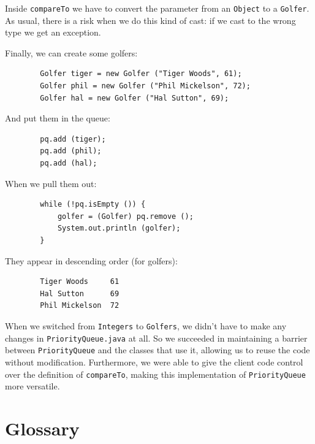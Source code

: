 \documentclass[12pt]{book}
\theoremstyle{exercise}
\begin{document}
Inside {\tt compareTo} we have to convert the parameter from
an {\tt Object} to a {\tt Golfer}.  As usual, there is a risk
when we do this kind of cast: if we cast to the wrong type we
get an exception.

Finally, we can create some golfers:

\begin{verbatim}
        Golfer tiger = new Golfer ("Tiger Woods", 61);
        Golfer phil = new Golfer ("Phil Mickelson", 72);
        Golfer hal = new Golfer ("Hal Sutton", 69);
\end{verbatim}
%
And put them in the queue:

\begin{verbatim}
        pq.add (tiger);
        pq.add (phil);
        pq.add (hal);
\end{verbatim}
%
When we pull them out:

\begin{verbatim}
        while (!pq.isEmpty ()) {
            golfer = (Golfer) pq.remove ();
            System.out.println (golfer);
        }
\end{verbatim}
%
They appear in descending order (for golfers):

\begin{verbatim}
        Tiger Woods     61
        Hal Sutton      69
        Phil Mickelson  72
\end{verbatim}
%
When we switched from {\tt Integers} to {\tt Golfers}, we didn't
have to make any changes in {\tt PriorityQueue.java} at all.  So
we succeeded in maintaining a barrier between {\tt PriorityQueue}
and the classes that use it, allowing us to reuse the code without
modification.  Furthermore, we were able to give the client code
control over the definition of {\tt compareTo}, making this
implementation of {\tt PriorityQueue} more versatile.



\section{Glossary}
\end{document}
